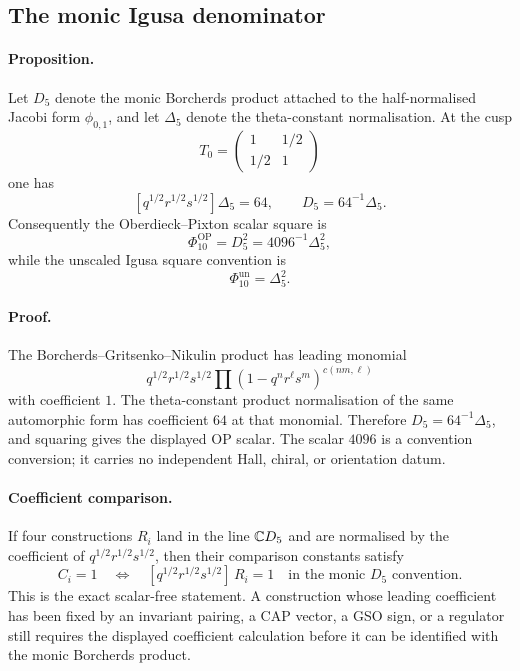 \subsection*{The monic Igusa denominator}
\label{subsec:conj1-monic-denominator}

\paragraph{Proposition.}
Let \(D_5\) denote the monic Borcherds product attached to the
half-normalised Jacobi form \(\phi_{0,1}\), and let \(\Delta_5\) denote
the theta-constant normalisation.  At the cusp
\[
        T_0=\begin{pmatrix}1&1/2\\[2pt]1/2&1\end{pmatrix}
\]
one has
\[
        [q^{1/2}r^{1/2}s^{1/2}]\Delta_5=64,\qquad
        D_5=64^{-1}\Delta_5 .
\]
Consequently the Oberdieck--Pixton scalar square is
\[
        \Phi_{10}^{\mathrm{OP}}
        =D_5^2
        =4096^{-1}\Delta_5^2,
\]
while the unscaled Igusa square convention is
\[
        \Phi_{10}^{\mathrm{un}}=\Delta_5^2 .
\]

\paragraph{Proof.}
The Borcherds--Gritsenko--Nikulin product has leading monomial
\[
        q^{1/2}r^{1/2}s^{1/2}
        \prod(1-q^nr^\ell s^m)^{c(nm,\ell)}
\]
with coefficient \(1\).  The theta-constant product normalisation of the
same automorphic form has coefficient \(64\) at that monomial.  Therefore
\(D_5=64^{-1}\Delta_5\), and squaring gives the displayed OP scalar.
The scalar \(4096\) is a convention conversion; it carries no independent
Hall, chiral, or orientation datum.

\paragraph{Coefficient comparison.}
If four constructions \(R_i\) land in the line
\(\mathbb{C} D_5\) and are normalised by the coefficient of
\(q^{1/2}r^{1/2}s^{1/2}\), then their comparison constants satisfy
\[
        C_i=1
        \quad\Longleftrightarrow\quad
        [q^{1/2}r^{1/2}s^{1/2}]\,R_i=1
        \quad\text{in the monic \(D_5\) convention}.
\]
This is the exact scalar-free statement.  A construction whose leading
coefficient has been fixed by an invariant pairing, a CAP vector, a GSO
sign, or a regulator still requires the displayed coefficient
calculation before it can be identified with the monic Borcherds product.

